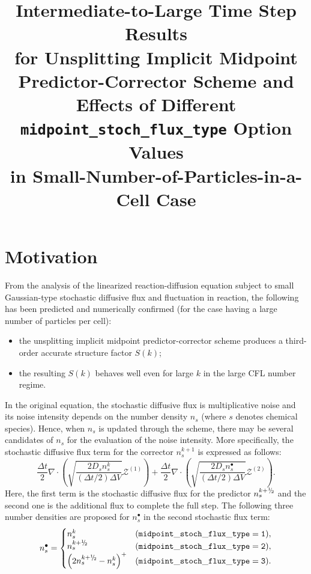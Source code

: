 \documentclass{article}
\def\mZb {\bm{\mathcal{Z}}}
\def\myhalf {\sfrac{1}{2}}
\newcommand{\sfrac}[2]{\mathchoice
  {\kern0em\raise.5ex\hbox{\the\scriptfont0 #1}\kern-.15em/
   \kern-.15em\lower.25ex\hbox{\the\scriptfont0 #2}}
  {\kern0em\raise.5ex\hbox{\the\scriptfont0 #1}\kern-.15em/
   \kern-.15em\lower.25ex\hbox{\the\scriptfont0 #2}}
  {\kern0em\raise.5ex\hbox{\the\scriptscriptfont0 #1}\kern-.2em/
   \kern-.15em\lower.25ex\hbox{\the\scriptscriptfont0 #2}}
  {#1\!/#2}}
\begin{document}
\title{Intermediate-to-Large Time Step Results \\ for Unsplitting Implicit Midpoint Predictor-Corrector Scheme and \\ Effects of Different \texttt{midpoint\_stoch\_flux\_type} Option Values \\ in Small-Number-of-Particles-in-a-Cell Case}

\date{}

\maketitle

\section{Motivation}

From the analysis of the linearized reaction-diffusion equation subject to small Gaussian-type stochastic diffusive flux and fluctuation in reaction, the following has been predicted and numerically confirmed (for the case having a large number of particles per cell):
\begin{itemize}
\item the unsplitting implicit midpoint predictor-corrector scheme produces a third-order accurate structure factor $S(k)$;
\item the resulting $S(k)$ behaves well even for large $k$ in the large CFL number regime.
\end{itemize}
In the original equation, the stochastic diffusive flux is multiplicative noise and its noise intensity depends on the number density $n_s$ (where $s$ denotes chemical species).
Hence, when $n_s$ is updated through the scheme, there may be several candidates of $n_s$ for the evaluation of the noise intensity.
More specifically, the stochastic diffusive flux term for the corrector $n_s^{k+1}$ is expressed as follows:
\begin{equation}
\frac{\Delta t}{2}\nabla\cdot\left(
\sqrt{\frac{2 D_s n_s^k}{(\Delta t/2)\Delta V}}\mZb^{(1)}\right)
+
\frac{\Delta t}{2}\nabla\cdot\left(
\sqrt{\frac{2 D_s n_s^\bullet}{(\Delta t/2)\Delta V}}\mZb^{(2)}
\right).
\end{equation}
Here, the first term is the stochastic diffusive flux for the predictor $n_s^{k+\myhalf}$ and the second one is the additional flux to complete the full step.
The following three number densities are proposed for $n_s^\bullet$ in the second stochastic flux term:
\begin{equation}
\label{nbullet}
n_s^\bullet=
\begin{cases}
n_s^k & (\mathtt{midpoint\_stoch\_flux\_type=1}), \\
n_s^{k+\myhalf} & (\mathtt{midpoint\_stoch\_flux\_type=2}), \\
\left(2 n_s^{k+\myhalf}-n_s^k\right)^+ & (\mathtt{midpoint\_stoch\_flux\_type=3}).
\end{cases}
\end{equation}
\end{document}
